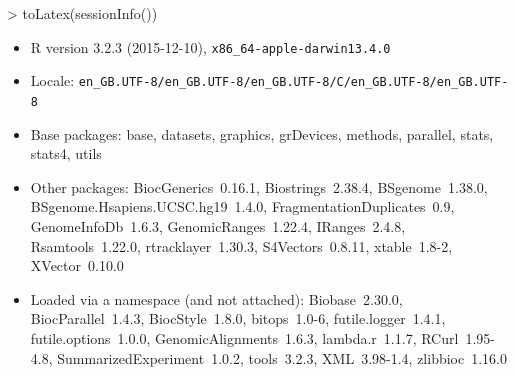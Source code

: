 \documentclass{article}
\begin{document}
\begin{Schunk}
\begin{Sinput}
> toLatex(sessionInfo())
\end{Sinput}
\begin{itemize}\raggedright
  \item R version 3.2.3 (2015-12-10), \verb|x86_64-apple-darwin13.4.0|
  \item Locale: \verb|en_GB.UTF-8/en_GB.UTF-8/en_GB.UTF-8/C/en_GB.UTF-8/en_GB.UTF-8|
  \item Base packages: base, datasets, graphics, grDevices, methods, parallel,
    stats, stats4, utils
  \item Other packages: BiocGenerics~0.16.1, Biostrings~2.38.4, BSgenome~1.38.0,
    BSgenome.Hsapiens.UCSC.hg19~1.4.0, FragmentationDuplicates~0.9,
    GenomeInfoDb~1.6.3, GenomicRanges~1.22.4, IRanges~2.4.8, Rsamtools~1.22.0,
    rtracklayer~1.30.3, S4Vectors~0.8.11, xtable~1.8-2, XVector~0.10.0
  \item Loaded via a namespace (and not attached): Biobase~2.30.0,
    BiocParallel~1.4.3, BiocStyle~1.8.0, bitops~1.0-6, futile.logger~1.4.1,
    futile.options~1.0.0, GenomicAlignments~1.6.3, lambda.r~1.1.7,
    RCurl~1.95-4.8, SummarizedExperiment~1.0.2, tools~3.2.3, XML~3.98-1.4,
    zlibbioc~1.16.0
\end{itemize}\end{Schunk}
\end{document}
